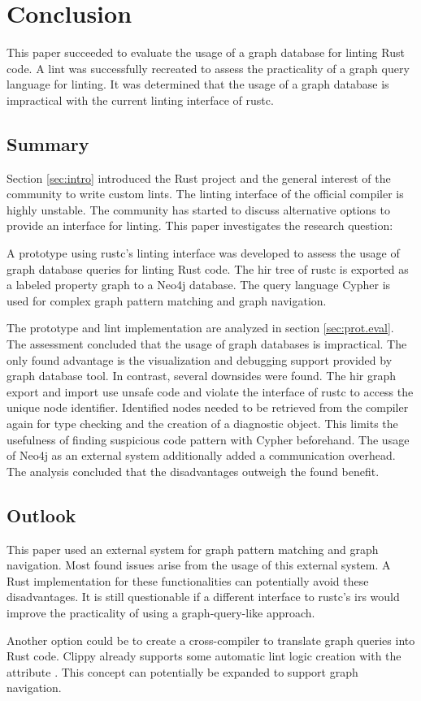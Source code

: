 \section{Conclusion}

This paper succeeded to evaluate the usage of a graph database for linting Rust code. A lint was successfully recreated to assess the practicality of a graph query language for linting. It was determined that the usage of a graph database is impractical with the current linting interface of rustc.

\subsection{Summary}

Section \ref{sec:intro} introduced the Rust project and the general interest of the community to write custom lints. The linting interface of the official compiler is highly unstable. The community has started to discuss alternative options to provide an interface for linting. This paper investigates the research question: 

A prototype using rustc's linting interface was developed to assess the usage of graph database queries for linting Rust code. The \acrshort{hir} tree of rustc is exported as a labeled property graph to a Neo4j database. The query language Cypher is used for complex graph pattern matching and graph navigation.  

The prototype and lint implementation are analyzed in section \ref{sec:prot.eval}. The assessment concluded that the usage of graph databases is impractical. The only found advantage is the visualization and debugging support provided by graph database tool. In contrast, several downsides were found. The \acrshort{hir} graph export and import use unsafe code and violate the interface of rustc to access the unique node identifier. Identified nodes needed to be retrieved from the compiler again for type checking and the creation of a diagnostic object. This limits the usefulness of finding suspicious code pattern with Cypher beforehand. The usage of Neo4j as an external system additionally added a communication overhead. The analysis concluded that the disadvantages outweigh the found benefit.

\subsection{Outlook}

This paper used an external system for graph pattern matching and graph navigation. Most found issues arise from the usage of this external system. A Rust implementation for these functionalities can potentially avoid these disadvantages. It is still questionable if a different interface to rustc's \acrshort{ir}s would improve the practicality of using a graph-query-like approach.

Another option could be to create a cross-compiler to translate graph queries into Rust code. Clippy already supports some automatic lint logic creation with the  attribute \cite{clippy0000.addlint}. This concept can potentially be expanded to support graph navigation.
